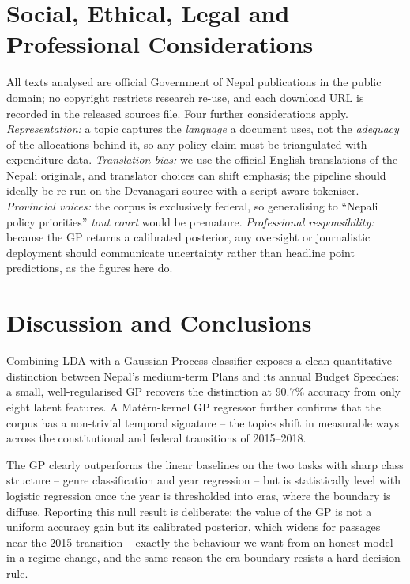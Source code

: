 \documentclass[conference]{IEEEtran}
\begin{document}
\section{Social, Ethical, Legal and Professional Considerations}
\label{sec:ethics}
All texts analysed are official Government of Nepal publications in
the public domain; no copyright restricts research re-use, and each
download URL is recorded in the released sources file.  Four further
considerations apply.  \emph{Representation:} a topic captures the
\emph{language} a document uses, not the \emph{adequacy} of the
allocations behind it, so any policy claim must be triangulated with
expenditure data.  \emph{Translation bias:} we use the official
English translations of the Nepali originals, and translator choices
can shift emphasis; the pipeline should ideally be re-run on the
Devanagari source with a script-aware tokeniser.  \emph{Provincial
voices:} the corpus is exclusively federal, so generalising to
``Nepali policy priorities'' \textit{tout court} would be premature.
\emph{Professional responsibility:} because the GP returns a
calibrated posterior, any oversight or journalistic deployment should
communicate uncertainty rather than headline point predictions, as
the figures here do.

\section{Discussion and Conclusions}\label{sec:discussion}
Combining LDA with a Gaussian Process classifier exposes a clean
quantitative distinction between Nepal's medium-term Plans and its
annual Budget Speeches: a small, well-regularised GP recovers the
distinction at $90.7\%$ accuracy from only eight latent features.
A Mat\'ern-kernel GP regressor further confirms that the corpus has a
non-trivial temporal signature -- the topics shift in measurable ways
across the constitutional and federal transitions of 2015--2018.

The GP clearly outperforms the linear baselines on the two tasks with
sharp class structure -- genre classification and year regression --
but is statistically level with logistic regression once the year is
thresholded into eras, where the boundary is diffuse.  Reporting this
null result is deliberate: the value of the GP is not a uniform
accuracy gain but its calibrated posterior, which widens for passages
near the 2015 transition -- exactly the behaviour we want from an
honest model in a regime change, and the same reason the era boundary
resists a hard decision rule.
\end{document}
